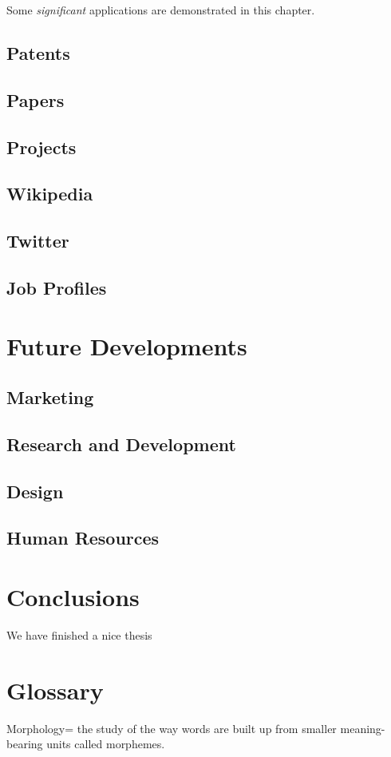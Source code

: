 \documentclass[]{book}
\begin{document}
Some \emph{significant} applications are demonstrated in this chapter.

\section{Patents}\label{patents-1}

\section{Papers}\label{papers-1}

\section{Projects}\label{projects-1}

\section{Wikipedia}\label{wikipedia-1}

\section{Twitter}\label{twitter-1}

\section{Job Profiles}\label{job-profiles-1}

\chapter{Future Developments}\label{future-developments}

\section{Marketing}\label{marketing}

\section{Research and Development}\label{research-and-development}

\section{Design}\label{design}

\section{Human Resources}\label{human-resources}

\chapter{Conclusions}\label{conclusions}

We have finished a nice thesis

\chapter{Glossary}\label{glossary}

Morphology= the study of the way words are built up from smaller
meaning-bearing units called morphemes.


\end{document}
